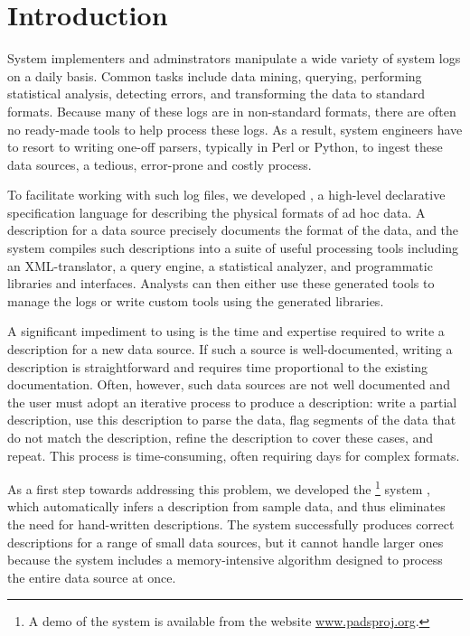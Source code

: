 \section{Introduction}
\label{sec:intro}

System implementers and adminstrators manipulate a wide
variety of system logs on a daily basis.
Common tasks include data mining, querying, performing statistical analysis,
detecting errors, and transforming the data to standard formats.
Because many of these logs are in non-standard formats,
there are often no ready-made tools to help process these logs.
As a result, system engineers have to resort to writing one-off
parsers, typically in Perl or Python, to ingest these data sources,
a tedious, error-prone and costly process. 

To facilitate working with such log files, we developed \pads
\cite{fisher+:pads}, a high-level declarative
specification language for describing the physical formats of ad hoc
data. A \pads{} description for a data source precisely documents the
format of the data, and the \pads{} system compiles such descriptions
into a suite of useful processing tools including an XML-translator, a
query engine, a statistical analyzer, and programmatic libraries and
interfaces. Analysts can then either use these generated tools to
manage the logs or write custom tools using the generated libraries.

A significant impediment to using \pads{} is the time and 
expertise required to write a \pads{} description for a new data
source.  If such a source is well-documented, writing a \pads{}
description is straightforward and requires time proportional to the
existing documentation.  Often, however, such data sources are not
well documented and the user must adopt an iterative process to produce
a description: write a partial description, use this description to
parse the data, flag segments of the data that do not match the
description, refine the description to cover these cases, and repeat.
This process is time-consuming, often requiring days for complex
formats. 

As a first step towards addressing this problem, we developed the
\learnpads{}\footnote{
  A demo of the \learnpads{} system is available from the \pads{} website \url{www.padsproj.org}.
}
system \cite{Fisher+:dirttoshovels,xi08:tokenization-short},
which automatically infers a \pads{} description from sample data, and
thus eliminates the need for hand-written descriptions. The
\learnpads{} system successfully produces correct descriptions for a
range of small data sources, but it cannot handle larger ones because
the system includes a memory-intensive algorithm designed to process
the entire data source at once.

